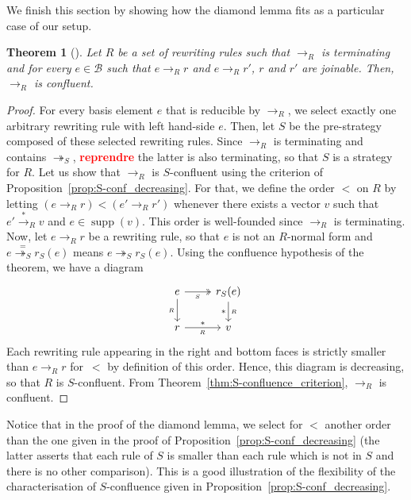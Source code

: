 \documentclass[10pt]{easychair}
\newtheorem{theorem}{Theorem}[section]
\theoremstyle{definition}
\newcommand\todo[1]{{\bf\textcolor{red}{#1}}}
\DeclareMathOperator{\supp}{supp}
\newcommand\basis{\mathscr{B}}
\newcommand\rewR{\to_R}
\newcommand\rewS{\twoheadrightarrow_S}
\newcommand\transR{\overset{*}{\to}_R}
\begin{document}
We finish this section by showing how the diamond lemma fits as a
particular case of our setup.
\medskip

\begin{theorem}[\cite{MR506890}]\label{thm:diamond_lemma}
  Let $R$ be a set of rewriting rules such that $\rewR$ is terminating
  and for every $e\in\basis$ such that $e\rewR r$ and $e\rewR r'$, $r$
  and $r'$ are joinable. Then,~$\rewR$ is confluent.
\end{theorem}

\begin{proof}
  For every basis element $e$ that is reducible by $\rewR$, we select
  exactly one arbitrary rewriting rule with left hand-side
  $e$. Then, let $S$ be the pre-strategy composed of these selected
  rewriting rules. Since $\rewR$ is terminating and contains $\rewS$,
  \todo{reprendre} the
  latter is also terminating, so that $S$ is a strategy for $R$. Let us
  show that $\rewR$ is $S$-confluent using the criterion of
  Proposition~\ref{prop:S-conf_decreasing}. For that, we define the order
  $<$ on $R$ by letting $(e\rewR r)<(e'\rewR r')$ whenever there exists a
  vector $v$ such that $e'\transR v$ and $e\in\supp(v)$. This order is
  well-founded since $\rewR$ is terminating. Now, let $e\rewR r$ be a
  rewriting rule, so that $e$ is not an $R$-normal form and
  $e\overset{=}{\rewS}r_S(e)$ means $e\rewS r_S(e)$. Using the confluence
  hypothesis of the theorem, we have a diagram
  \[\begin{tikzcd}
  e\ar[d, "_R"']\ar[r, twoheadrightarrow, "_S"'] &
  r_S(e)\ar[d, rightarrow, "*"', "_R"]\\
  r\ar[r, rightarrow, "*", "_R"'] & v
  \end{tikzcd}\]
  Each rewriting rule appearing in the right and bottom faces is strictly
  smaller than $e\rewR r$ for~$<$ by definition of this order. Hence,
  this diagram is decreasing, so that $R$ is $S$-confluent. From 
  Theorem~\ref{thm:S-confluence_criterion}, $\rewR$ is confluent.   
\end{proof}
\smallskip

Notice that in the proof of the diamond lemma, we select for $<$ another order
than the one given in the proof of Proposition~\ref{prop:S-conf_decreasing} (the
latter asserts that each rule of $S$ is smaller than each rule which is not in
$S$ and there is no other comparison). This is a good illustration of the
flexibility of the characterisation of $S$-confluence given in
Proposition~\ref{prop:S-conf_decreasing}.
\end{document}
